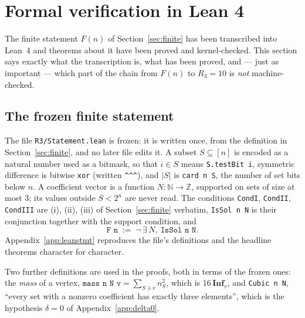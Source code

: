 \documentclass[11pt,reqno]{amsart}
\theoremstyle{plain}
\theoremstyle{definition}
\numberwithin{theorem}{section}
\newcommand{\Inf}{\mathbf{Inf}}
\begin{document}
\section{Formal verification in Lean 4}\label{sec:lean}

The finite statement $F(n)$ of Section~\ref{sec:finite} has been transcribed into Lean~4 and
theorems about it have been proved and kernel-checked. This section says exactly what the
transcription is, what has been proved, and --- just as important --- which part of the chain
from $F(n)$ to $R_3 = 10$ is \emph{not} machine-checked.

\subsection{The frozen finite statement}
The file \texttt{R3/Statement.lean} is frozen: it is written once, from the definition in
Section~\ref{sec:finite}, and no later file edits it. A subset $S \subseteq [n]$ is encoded as
a natural number used as a bitmask, so that $i \in S$ means \texttt{S.testBit i}, symmetric
difference is bitwise \texttt{xor} (written \texttt{\^{}\^{}\^{}}), and $|S|$ is
\texttt{card n S}, the number of set bits below $n$. A coefficient vector is a function
$N : \mathbb{N} \to \mathbb{Z}$, supported on sets of size at most $3$; its values outside
$S < 2^n$ are never read. The conditions \texttt{CondI}, \texttt{CondII}, \texttt{CondIII} are
(i), (ii), (iii) of Section~\ref{sec:finite} verbatim, \texttt{IsSol n N} is their conjunction
together with the support condition, and
\[
  \texttt{F n} \; := \; \neg\, \exists\, N, \ \texttt{IsSol n N}.
\]
Appendix~\ref{app:leanstmt} reproduces the file's definitions and the headline theorems
character for character.

Two further definitions are used in the proofs, both in terms of the frozen ones: the
\emph{mass} of a vertex, $\texttt{mass n N v} = \sum_{S \ni v} n_S^2$, which is $16\,\Inf_v$,
and \texttt{Cubic n N}, ``every set with a nonzero coefficient has exactly three elements'',
which is the hypothesis $\delta = 0$ of Appendix~\ref{app:delta0}.
\end{document}
